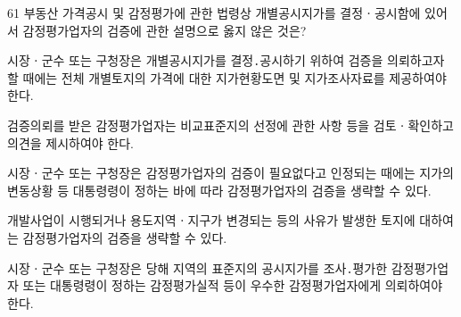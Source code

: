 \begin{question}{61}
부동산 가격공시 및 감정평가에 관한 법령상 개별공시지가를 결정ㆍ공시함에 있어서 감정평가업자의 검증에 관한 설명으로 옳지 않은 것은?
\begin{choices}
  \item 시장ㆍ군수 또는 구청장은 개별공시지가를 결정․공시하기 위하여 검증을 의뢰하고자 할 때에는 전체 개별토지의 가격에 대한 지가현황도면 및 지가조사자료를 제공하여야 한다.
  \item 검증의뢰를 받은 감정평가업자는 비교표준지의 선정에 관한 사항 등을 검토ㆍ확인하고 의견을 제시하여야 한다.
  \item 시장ㆍ군수 또는 구청장은 감정평가업자의 검증이 필요없다고 인정되는 때에는 지가의 변동상황 등 대통령령이 정하는 바에 따라 감정평가업자의 검증을 생략할 수 있다.
  \item 개발사업이 시행되거나 용도지역ㆍ지구가 변경되는 등의 사유가 발생한 토지에 대하여는 감정평가업자의 검증을 생략할 수 있다.
  \item 시장ㆍ군수 또는 구청장은 당해 지역의 표준지의 공시지가를 조사․평가한 감정평가업자 또는 대통령령이 정하는 감정평가실적 등이 우수한 감정평가업자에게 의뢰하여야 한다.
\end{choices}
\end{question}
